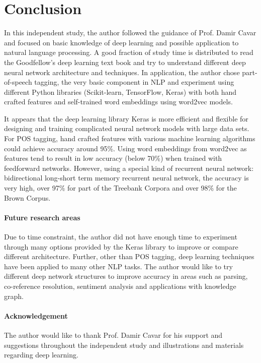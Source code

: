 \documentclass[11pt]{article}
\theoremstyle{plain}
\begin{document}
\section{Conclusion}
\label{s:conclusion}

In this independent study, the author followed the guidance of Prof. Damir 
Cavar and focused on basic knowledge of deep learning and possible 
application to natural language processing. A good fraction of study time is 
distributed to read the Goodfellow's deep learning text book and try to 
understand different deep neural network architecture and techniques. In 
application, the author chose part-of-speech tagging, the very basic 
component in NLP and experiment using different Python libraries 
(Scikit-learn, TensorFlow, Keras) with both hand crafted features and 
self-trained word embeddings using word2vec models. 

It appears that the deep learning library Keras is more efficient and flexible 
for designing and training complicated neural network models with large data 
sets. For POS tagging, hand crafted features with various machine learning 
algorithms could achieve accuracy around 95\%. Using word embeddings 
from word2vec as features tend to result in low accuracy (below 70\%) when 
trained with feedforward networks. However, using a special kind of 
recurrent neural network: bidirectional long-short term memory recurrent 
neural network, the accuracy is very high, over 97\% for part of the Treebank 
Corpora and over 98\% for the Brown Corpus. 

\paragraph{Future research areas} Due to time constraint, the author did 
not have enough time to experiment through many options provided by the 
Keras library to improve or compare different architecture. Further, other 
than POS tagging, deep learning techniques have been applied to many other 
NLP tasks. The author would like to try different deep network structures to 
improve accuracy in areas such as parsing, co-reference resolution, 
sentiment analysis and applications with knowledge graph. 

\paragraph{Acknowledgement }The author would like to thank Prof. Damir 
Cavar for his support and suggestions throughout the independent study 
and illustrations and materials regarding deep learning. 
\end{document}

